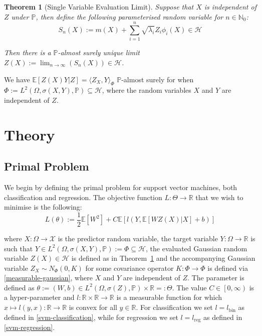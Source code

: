 \documentclass{article}
\newtheorem{theorem}{Theorem}
\begin{document}
\begin{theorem}[Single Variable Evaluation Limit]\label{thm:single-variable-gaussian}
Suppose that $X$ is independent of $Z$ under $\mathbb{P}$, then define the following parameterised random variable for $n \in \mathbb{N}_0$:
\begin{equation}
S_n (X) := m(X) + \sum_{i = 1}^n \sqrt{\lambda_i} Z_i \phi_i (X) \in \mathcal{H}
\end{equation}

Then there is a $\mathbb{P}$-almost surely unique limit $Z(X) := \lim_{n \rightarrow \infty} (S_n (X)) \in \mathcal{H}$. 
\end{theorem} 

We have $\mathbb{E}[Z(X)Y | Z] = \langle Z_X , Y \rangle_{\Phi}$ $\mathbb{P}$-almost surely for when $\Phi := L^2 (\Omega , \sigma(X, Y), \mathbb{P}) \subseteq \mathcal{H}$, where the random variables $X$ and $Y$ are independent of $Z$.

\section{Theory} \label{theory-section}

\subsection{Primal Problem}

We begin by defining the primal problem for support vector machines, both classification and regression. The objective function $L : \Theta \rightarrow \mathbb{R}$ that we wish to minimise is the following:
\begin{equation}\label{primal-problem}
L(\theta) := \dfrac{1}{2} \mathbb{E}[W^2] + C \mathbb{E}[l(Y , \mathbb{E}[W Z(X)| X] + b)]
\end{equation}

where $X : \Omega \rightarrow \mathcal{X}$ is the predictor random variable, the target variable $Y : \Omega \rightarrow \mathbb{R}$ is such that $Y \in L^2(\Omega , \sigma(X, Y), \mathbb{P}) := \Phi \subseteq \mathcal{H}$, the evaluated Gaussian random variable $Z(X) \in \mathcal{H}$ is defined as in Theorem~\ref{thm:single-variable-gaussian} and the accompanying Gaussian variable $Z_X \sim N_{\Phi} (0 , K)$ for some covariance operator $K : \Phi \rightarrow \Phi$ is defined via \ref{measurable-gaussian}, where $X$ and $Y$ are independent of $Z$. The parameter is defined as $\theta := \left(W , b\right) \in L^2\left(\Omega , \sigma(Z), \mathbb{P}\right) \times \mathbb{R} =: \Theta$. The value $C \in \left[0 , \infty\right)$ is a hyper-parameter and $l : \mathbb{R} \times \mathbb{R} \rightarrow \mathbb{R}$ is a measurable function for which $x \mapsto l\left(y , x\right) : \mathbb{R} \rightarrow \mathbb{R}$ is convex for all $y \in \mathbb{R}$. For classification we set $l = l_{\text{bin}}$ as defined in \ref{svm-classification}, while for regression we set $l = l_{\text{reg}}$ as defined in \ref{svm-regression}.
\end{document}
